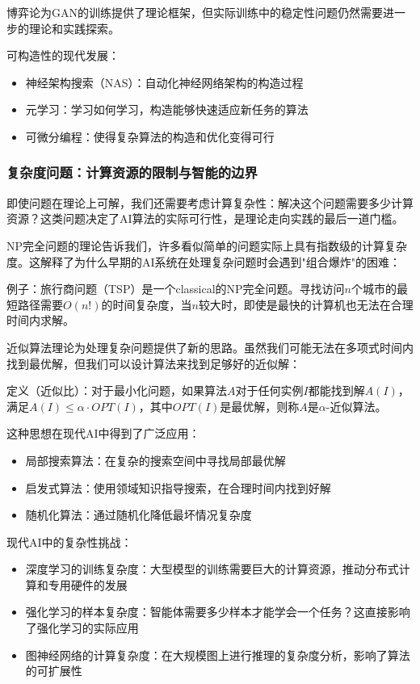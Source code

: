 博弈论为GAN的训练提供了理论框架，但实际训练中的稳定性问题仍然需要进一步的理论和实践探索。

可构造性的现代发展：

\begin{itemize}
\item 神经架构搜索（NAS）：自动化神经网络架构的构造过程
\item 元学习：学习如何学习，构造能够快速适应新任务的算法
\item 可微分编程：使得复杂算法的构造和优化变得可行
\end{itemize}

\subsubsection{复杂度问题：计算资源的限制与智能的边界}

即使问题在理论上可解，我们还需要考虑计算复杂性：解决这个问题需要多少计算资源？这类问题决定了AI算法的实际可行性，是理论走向实践的最后一道门槛。

NP完全问题的理论告诉我们，许多看似简单的问题实际上具有指数级的计算复杂度。这解释了为什么早期的AI系统在处理复杂问题时会遇到"组合爆炸"的困难：

例子：旅行商问题（TSP）是一个classical的NP完全问题。寻找访问$n$个城市的最短路径需要$O(n!)$的时间复杂度，当$n$较大时，即使是最快的计算机也无法在合理时间内求解。

近似算法理论为处理复杂问题提供了新的思路。虽然我们可能无法在多项式时间内找到最优解，但我们可以设计算法来找到足够好的近似解：

定义（近似比）：对于最小化问题，如果算法$A$对于任何实例$I$都能找到解$A(I)$，满足$A(I) \leq \alpha \cdot OPT(I)$，其中$OPT(I)$是最优解，则称$A$是$\alpha$-近似算法。

这种思想在现代AI中得到了广泛应用：

\begin{itemize}
\item 局部搜索算法：在复杂的搜索空间中寻找局部最优解
\item 启发式算法：使用领域知识指导搜索，在合理时间内找到好解
\item 随机化算法：通过随机化降低最坏情况复杂度
\end{itemize}

现代AI中的复杂性挑战：

\begin{itemize}
\item 深度学习的训练复杂度：大型模型的训练需要巨大的计算资源，推动分布式计算和专用硬件的发展
\item 强化学习的样本复杂度：智能体需要多少样本才能学会一个任务？这直接影响了强化学习的实际应用
\item 图神经网络的计算复杂度：在大规模图上进行推理的复杂度分析，影响了算法的可扩展性
\end{itemize}

